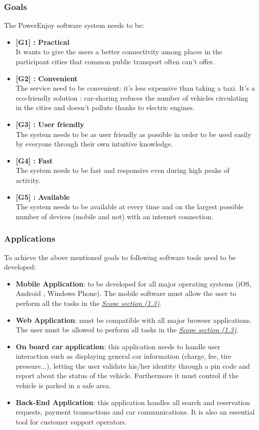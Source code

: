 \documentclass[11pt]{article}
\begin{document}
	\subsubsection{Goals}
	The PowerEnjoy software system needs to be:
	\begin{itemize}
		\item \textbf{[G1] : Practical}\\It wants to give the users a better connectivity among places in the participant cities that common public transport often can't offer.
		\item \textbf{[G2] : Convenient}\\The service need to be convenient: it's less expensive than taking a taxi. It's a eco-friendly solution : car-sharing reduces the number of vehicles circulating in the cities and doesn't pollute thanks to electric engines.
		\item \textbf{[G3] : User friendly}\\ The system needs to be as user friendly as possible in order to be used easily by everyone through their own intuitive knowledge. 
		\item \textbf{[G4] : Fast}\\ The system needs to be fast and responsive even during high peaks of activity.
		\item \textbf{[G5] : Available}\\ The system needs to be available at every time and on the largest possible number of devices (mobile and not) with an internet connection.
	\end{itemize}
	
	\subsubsection{Applications}
	To achieve the above mentioned goals to following software tools need to be developed:
	
	\begin{itemize}
	\item \textbf{Mobile Application}: to be developed for all major operating systems (iOS, Android , Windows Phone). The mobile software must allow the user to perform all the tasks in the \hyperref[scope:1]{\textit{Scope section (1.3)}}.
	\item \textbf{Web Application}: must be compatible with all major browser applications. The user must be allowed to perform all tasks in  the \hyperref[scope:1]{\textit{Scope section (1.3)}}.
	\item \textbf{ On board car application}: this application needs to handle user interaction such as displaying general car information (charge, fee, tire pressure...), letting the user validate his/her identity through a pin code and report about the status of the vehicle. 
Furthermore it must control if the vehicle is parked in a safe area.
	\item \textbf{ Back-End Application}: this application handles all search and reservation requests, payment transactions and car communications. It is also an essential tool for customer support operators.
	
	\end{itemize}
		
\end{document}

